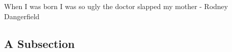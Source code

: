 \documentclass[a4paper,12pt]{book}
\begin{document}
 
When I was born I was so ugly the doctor slapped my mother - {Rodney Dangerfield} \\[2pt]
\blindtext
\subsection{A Subsection}
 
 
\blindtext
 
 
\clearpage
 
 
\printindex
 
\end{document}
